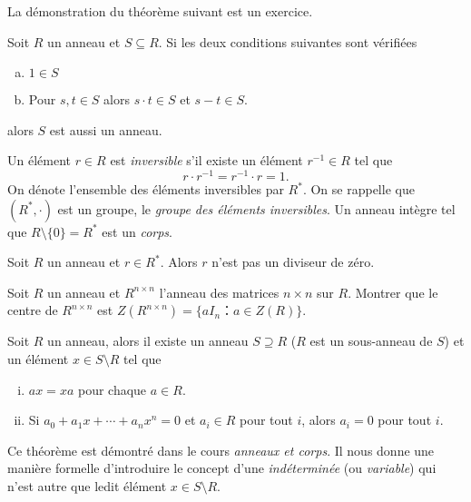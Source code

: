 La démonstration du théorème suivant est un exercice.  
\begin{theorem}
  \label{thr:58}
  Soit $R$ un anneau et $S ⊆R$. Si les deux conditions suivantes sont vérifiées 
  \begin{enumerate}[a)]
  \item $1 ∈ S$ \label{item:27}
  \item Pour $s,t ∈S$ alors  $s⋅t∈S$   et $s-t ∈S$. \label{item:28}
  \end{enumerate} 
  alors $S$ est aussi un anneau. 
\end{theorem}

Un élément $r ∈R$ est \emph{inversible} s'il existe un élément $r^{-1} ∈ R$ tel que
\begin{displaymath}
  r ⋅ r^{-1} = r^{-1} ⋅r = 1. 
\end{displaymath}
On dénote l'ensemble des éléments inversibles par $R^*$. On se rappelle que $(R^*, ⋅)$ est un groupe, le \emph{groupe des éléments inversibles}. Un anneau intègre tel que $R \setminus \{0\} = R^*$ est un \emph{corps}. 

\begin{exercise}
  \label{exe:39}
  Soit $R$ un anneau et $r ∈ R^*$. Alors $r$ n'est pas un diviseur de zéro. 
\end{exercise}

\begin{exercise}
  \label{exe:42}
  Soit $R$ un anneau et $R^{n ×n}$ l'anneau des matrices $n ×n$ sur $R$. Montrer que le centre de $R^{n ×n}$ est $Z(R^{n ×n}) = \{ a I_n ：a ∈Z(R)\}$. 
\end{exercise}

\begin{theorem}
  \label{thr:50}
  Soit $R$ un anneau, alors il existe un anneau $S ⊇R$ ($R$ est un sous-anneau de $S$) et un élément $x ∈ S \setminus R$ tel que
  \begin{enumerate}[(i)]
  \item $a x = x a $ pour chaque $a ∈ R$. \label{item:29}
  \item Si 
    $  a_0+ a_1x + \cdots + a_n x^n =0$  et $a_i ∈R$ pour tout $i$,  
    alors  $a_i = 0$ pour tout $i$. \label{item:30}
  \end{enumerate}
\end{theorem}
Ce théorème est démontré dans le cours \emph{anneaux et corps}.   Il nous donne une manière formelle d'introduire le concept d'une \emph{indéterminée} (ou  \emph{variable}) qui n'est autre que ledit élément $x ∈ S \setminus R$.  

